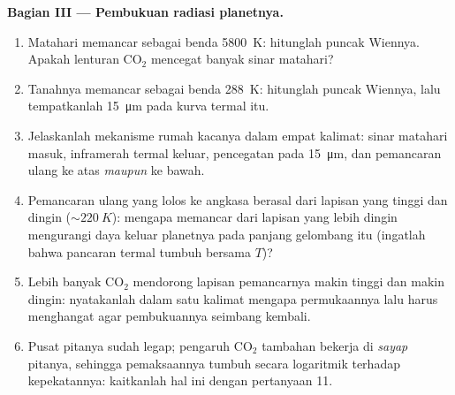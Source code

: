 \begin{problem}
\medskip\noindent\textbf{Bagian III --- Pembukuan radiasi planetnya.}
\begin{enumerate}[resume]
  \item Matahari memancar sebagai benda \qty{5800}{K}: hitunglah puncak
        Wiennya. Apakah lenturan CO$_2$ mencegat banyak sinar matahari?
  \item Tanahnya memancar sebagai benda \qty{288}{K}: hitunglah puncak
        Wiennya, lalu tempatkanlah \qty{15}{\micro m} pada kurva termal
        itu.
  \item Jelaskanlah mekanisme rumah kacanya dalam empat kalimat: sinar
        matahari masuk, inframerah termal keluar, pencegatan pada
        \qty{15}{\micro m}, dan pemancaran ulang ke atas \emph{maupun}
        ke bawah.
  \item Pemancaran ulang yang lolos ke angkasa berasal dari lapisan
        yang tinggi dan dingin ($\sim\qty{220}{K}$): mengapa memancar
        dari lapisan yang lebih dingin mengurangi daya keluar planetnya
        pada panjang gelombang itu (ingatlah bahwa pancaran termal
        tumbuh bersama $T$)?
  \item Lebih banyak CO$_2$ mendorong lapisan pemancarnya makin tinggi
        dan makin dingin: nyatakanlah dalam satu kalimat mengapa
        permukaannya lalu harus menghangat agar pembukuannya seimbang
        kembali.
  \item Pusat pitanya sudah legap; pengaruh CO$_2$ tambahan bekerja di
        \emph{sayap} pitanya, sehingga pemaksaannya tumbuh secara
        logaritmik terhadap kepekatannya: kaitkanlah hal ini dengan
        pertanyaan 11.
\end{enumerate}


\end{problem}
